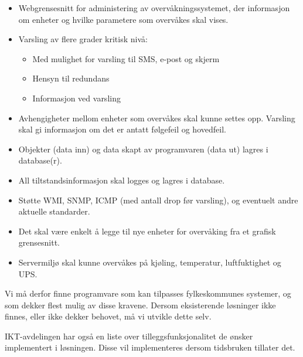 \begin{itemize}
	\item Webgrensesnitt for administering av overvåkningssystemet, der informasjon om enheter og hvilke parametere som overvåkes skal vises.
	\item  Varsling av flere grader kritisk nivå:
	\begin{itemize} 
		\item Med mulighet for varsling til SMS, e-post og skjerm
		\item Hensyn til redundans
		\item Informasjon ved varsling
	\end{itemize}
	\item Avhengigheter mellom enheter som overvåkes skal kunne settes opp. Varsling skal gi informasjon om det er antatt følgefeil og hovedfeil.
	\item Objekter (data inn) og data skapt av programvaren (data ut) lagres i database(r).
	\item All tiltstandsinformasjon skal logges og lagres i database.
	\item Støtte WMI, SNMP, ICMP (med antall drop før varsling), og eventuelt andre aktuelle standarder.
	\item Det skal være enkelt å legge til nye enheter for overvåking fra et grafisk grensesnitt.
	\item Servermiljø skal kunne overvåkes på kjøling, temperatur, luftfuktighet og UPS.
\end{itemize}

Vi må derfor finne programvare som kan tilpasses fylkeskommunes systemer, og som dekker flest mulig av disse kravene. Dersom eksisterende løsninger ikke finnes, eller ikke dekker behovet, må vi utvikle dette selv.

IKT-avdelingen har også en liste over tilleggsfunksjonalitet de ønsker implementert i løsningen. Disse vil implementeres dersom tidsbruken tillater det.

